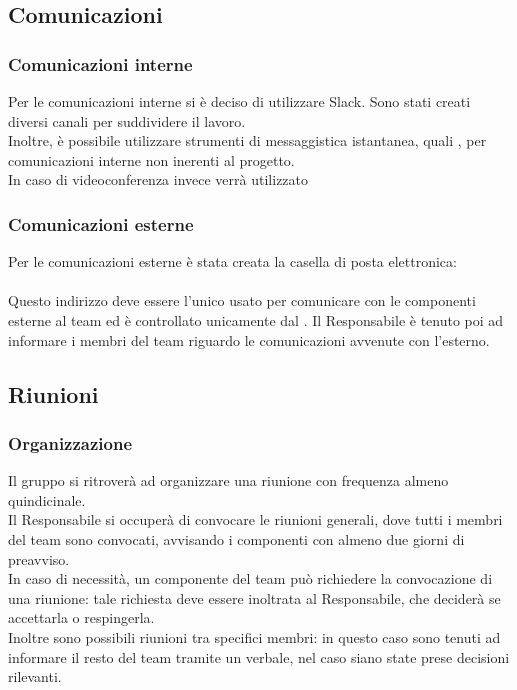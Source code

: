 \subsection{Comunicazioni}
	\subsubsection{Comunicazioni interne}
	Per le comunicazioni interne si è deciso di utilizzare Slack. Sono stati creati diversi canali per suddividere il lavoro. \\
	Inoltre, è possibile utilizzare strumenti di messaggistica istantanea, quali , per comunicazioni interne non inerenti al progetto. \\
	In caso di videoconferenza invece verrà utilizzato 	
	\subsubsection{Comunicazioni esterne}
	Per le comunicazioni esterne è stata creata la casella di posta elettronica: \\
	 \\
	Questo indirizzo deve essere l'unico usato per comunicare con le componenti esterne al team ed è controllato unicamente dal . Il Responsabile è tenuto poi ad informare i membri del team riguardo le comunicazioni avvenute con l'esterno.

\subsection{Riunioni}
	\subsubsection{Organizzazione}
	Il gruppo si ritroverà ad organizzare una riunione con frequenza almeno quindicinale. \\
	Il Responsabile si occuperà di convocare le riunioni generali, dove tutti i membri del team sono convocati, avvisando i componenti con almeno due giorni di preavviso. \\
	In caso di necessità, un componente del team può richiedere la convocazione di una riunione: tale richiesta deve essere inoltrata al Responsabile, che deciderà se accettarla o respingerla. \\
	Inoltre sono possibili riunioni tra specifici membri: in questo caso sono tenuti ad informare il resto del team tramite un verbale, nel caso siano state prese decisioni rilevanti. \\
	